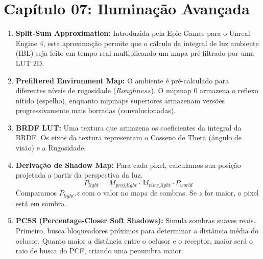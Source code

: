 \section*{Capítulo 07: Iluminação Avançada}
\begin{enumerate}
    \item \textbf{Split-Sum Approximation:} Introduzida pela Epic Games para o Unreal Engine 4, esta aproximação permite que o cálculo da integral de luz ambiente (IBL) seja feito em tempo real multiplicando um mapa pré-filtrado por uma LUT 2D.
    \item \textbf{Prefiltered Environment Map:} O ambiente é pré-calculado para diferentes níveis de rugosidade ($Roughness$). O mipmap 0 armazena o reflexo nítido (espelho), enquanto mipmaps superiores armazenam versões progressivamente mais borradas (convolucionadas).
    \item \textbf{BRDF LUT:} Uma textura que armazena os coeficientes da integral da BRDF. Os eixos da textura representam o Cosseno de Theta (ângulo de visão) e a Rugosidade.
    \item \textbf{Derivação de Shadow Map:} Para cada pixel, calculamos sua posição projetada a partir da perspectiva da luz.
    \begin{equation}
    P_{light} = M_{proj\_light} \cdot M_{view\_light} \cdot P_{world}
    \end{equation}
    Comparamos $P_{light}.z$ com o valor no mapa de sombras. Se $z$ for maior, o pixel está em sombra.
    \item \textbf{PCSS (Percentage-Closer Soft Shadows):} Simula sombras suaves reais. Primeiro, busca bloqueadores próximos para determinar a distância média do oclusor. Quanto maior a distância entre o oclusor e o receptor, maior será o raio de busca do PCF, criando uma penumbra maior.
\end{enumerate}

